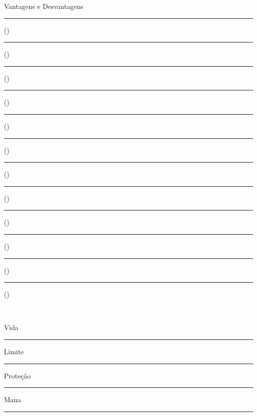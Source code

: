 \documentclass[a4paper,12pt]{article}
\begin{document}
	\begin{minipage}[t][][t]{.49\linewidth}
		{\centering Vantagens e Desvantagens \\[\baselineskip]}
		
		\vspace{.18cm}
		\rule{.4\linewidth}{.5pt}(\hspace{.05\linewidth}) \rule{.4\linewidth}{.5pt}(\hspace{.05\linewidth}) \\
		\rule{.4\linewidth}{.5pt}(\hspace{.05\linewidth}) \rule{.4\linewidth}{.5pt}(\hspace{.05\linewidth}) \\
		\rule{.4\linewidth}{.5pt}(\hspace{.05\linewidth}) \rule{.4\linewidth}{.5pt}(\hspace{.05\linewidth}) \\
		\rule{.4\linewidth}{.5pt}(\hspace{.05\linewidth}) \rule{.4\linewidth}{.5pt}(\hspace{.05\linewidth}) \\
		\rule{.4\linewidth}{.5pt}(\hspace{.05\linewidth}) \rule{.4\linewidth}{.5pt}(\hspace{.05\linewidth}) \\
		\rule{.4\linewidth}{.5pt}(\hspace{.05\linewidth}) \rule{.4\linewidth}{.5pt}(\hspace{.05\linewidth}) \\
	\end{minipage} \\

	\begin{minipage}{\linewidth}
		\begin{minipage}{.49\linewidth}
			\Sagittarius \hspace{3pt} Vida \rule{20pt}{.5pt}%
			\hspace{3pt}%
			Limite \rule{20pt}{.5pt}%
			\hspace{3pt}%
			Proteção \rule{20pt}{.5pt}%
			\hspace{3pt}%
		\end{minipage}%
		\hspace{.02\linewidth}%
		\begin{minipage}{.49\linewidth}
		\begin{flushleft}
			\Leo \hspace{3pt} Mana \rule{20pt}{.5pt}
		\end{flushleft}
		\end{minipage}
	\end{minipage} \\
	
\end{document}

